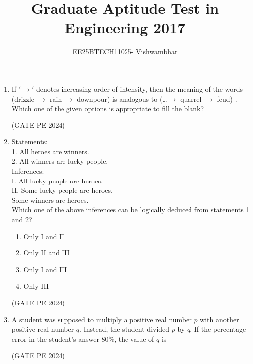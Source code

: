 \documentclass[journal,12pt,onecolumn]{IEEEtran}
\title{Graduate Aptitude Test in Engineering 2017}
\author{EE25BTECH11025- Vishwambhar}
\theoremstyle{remark}
\begin{document}
\maketitle

\begin{enumerate}

\item If $'\rightarrow'$  denotes increasing order of intensity, then the meaning of the words\\
(drizzle $\rightarrow$  rain $\rightarrow$ downpour) is analogous to (\dots $\rightarrow$ quarrel $\rightarrow$ feud) .\\
Which one of the given options is appropriate to fill the blank?
\begin{enumerate}
\end{enumerate}
\hfill{(GATE PE 2024)}

\item Statements:\\
1. All heroes are winners.\\
2. All winners are lucky people.\\
Inferences:\\
I. All lucky people are heroes.\\
II. Some lucky people are heroes.\\
Some winners are heroes.\\
Which one of the above inferences can be logically deduced from statements 1 and 2?
\begin{enumerate}
    \item Only I and II
    \item Only II and III
    \item Only I and III
    \item Only III
\end{enumerate}
\hfill{(GATE PE 2024)}

\item A student was supposed to multiply a positive real number $p$ with another positive real number $q$. Instead, the student divided $p$ by $q$. If the percentage error in the student's answer 80\%, the value of $q$ is 
\begin{enumerate}
\end{enumerate}
\hfill{(GATE PE 2024)}


\end{enumerate}
\end{document}
